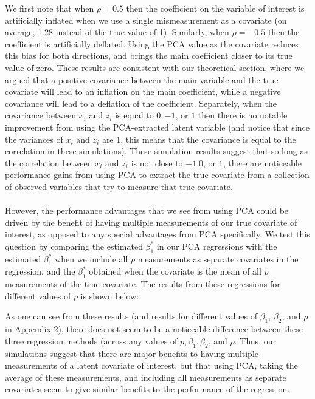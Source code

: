 \documentclass[12pt]{article}
\begin{document}
        We first note that when $\rho = 0.5$ then the coefficient on the variable of interest is artificially inflated when we use a single mismeasurement as a covariate (on average, 1.28 instead of the true value of 1). Similarly, when $\rho = -0.5$ then the coefficient is artificially deflated. Using the PCA value as the covariate reduces this bias for both directions, and brings the main coefficient closer to its true value of zero. These results are consistent with our theoretical section, where we argued that a positive covariance between the main variable and the true covariate will lead to an inflation on the main coefficient, while a negative covariance will lead to a deflation of the coefficient. Separately, when the covariance between $x_i$ and $z_i$ is equal to $0, -1$, or $1$ then there is no notable improvement from using the PCA-extracted latent variable (and notice that since the variances of $x_i$ and $z_i$ are 1, this means that the covariance is equal to the correlation in these simulations). These simulation results suggest that so long as the correlation between $x_i$ and $z_i$ is not close to $-1$,$0$, or $1$, there are noticeable performance gains from using PCA to extract the true covariate from a collection of observed variables that try to measure that true covariate.\\
        \\
        However, the performance advantages that we see from using PCA could be driven by the benefit of having multiple measurements of our true covariate of interest, as opposed to any special advantages from PCA specifically. We test this question by comparing the estimated $\beta_1^*$ in our PCA regressions with the estimated $\beta_1^*$ when we include all $p$ measurements as separate covariates in the regression, and the $\beta_1^*$ obtained when the covariate is the mean of all $p$ measurements of the true covariate. The results from these regressions for different values of $p$ is shown below:

        

        As one can see from these results (and results for different values of $\beta_1$, $\beta_2$, and $\rho$ in Appendix 2), there does not seem to be a noticeable difference between these three regression methods (across any values of $p, \beta_1,\beta_2$, and $\rho$. Thus, our simulations suggest that there are major benefits to having multiple measurements of a latent covariate of interest, but that using PCA, taking the average of these measurements, and including all measurements as separate covariates seem to give similar benefits to the performance of the regression.
\end{document}
